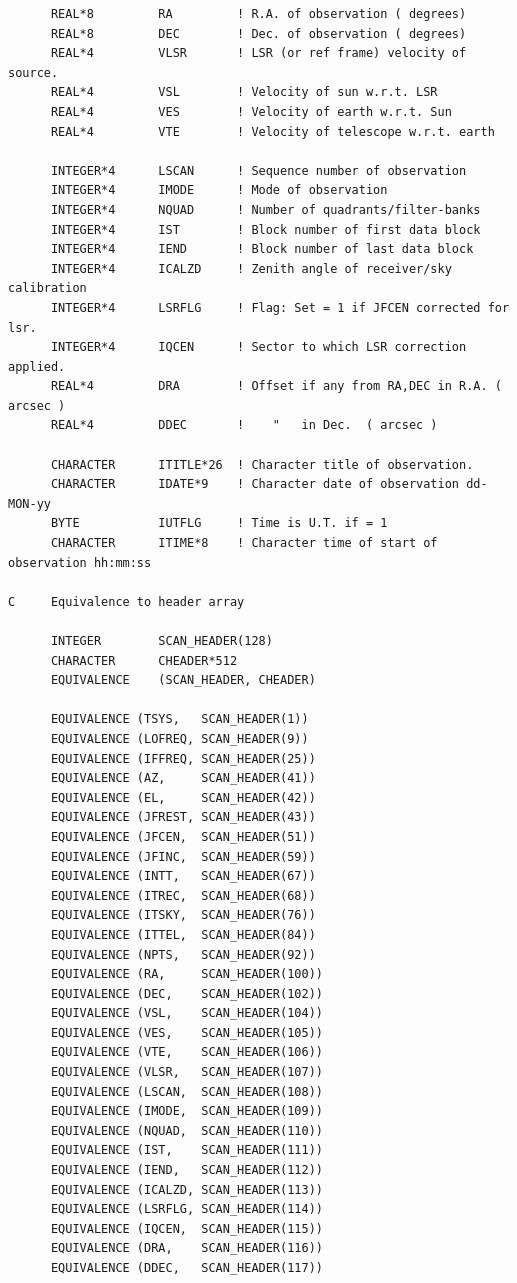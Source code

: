 \documentclass[11pt,twoside]{report}
\begin{document}
\begin{verbatim}
      REAL*8         RA         ! R.A. of observation ( degrees)
      REAL*8         DEC        ! Dec. of observation ( degrees)
      REAL*4         VLSR       ! LSR (or ref frame) velocity of source.
      REAL*4         VSL        ! Velocity of sun w.r.t. LSR
      REAL*4         VES        ! Velocity of earth w.r.t. Sun
      REAL*4         VTE        ! Velocity of telescope w.r.t. earth

      INTEGER*4      LSCAN      ! Sequence number of observation
      INTEGER*4      IMODE      ! Mode of observation
      INTEGER*4      NQUAD      ! Number of quadrants/filter-banks
      INTEGER*4      IST        ! Block number of first data block
      INTEGER*4      IEND       ! Block number of last data block
      INTEGER*4      ICALZD     ! Zenith angle of receiver/sky calibration
      INTEGER*4      LSRFLG     ! Flag: Set = 1 if JFCEN corrected for lsr.
      INTEGER*4      IQCEN      ! Sector to which LSR correction applied.
      REAL*4         DRA        ! Offset if any from RA,DEC in R.A. ( arcsec )
      REAL*4         DDEC       !    "   in Dec.  ( arcsec )      

      CHARACTER      ITITLE*26  ! Character title of observation.
      CHARACTER      IDATE*9    ! Character date of observation dd-MON-yy
      BYTE           IUTFLG     ! Time is U.T. if = 1
      CHARACTER      ITIME*8    ! Character time of start of observation hh:mm:ss

C     Equivalence to header array

      INTEGER        SCAN_HEADER(128)
      CHARACTER      CHEADER*512
      EQUIVALENCE    (SCAN_HEADER, CHEADER)

      EQUIVALENCE (TSYS,   SCAN_HEADER(1))
      EQUIVALENCE (LOFREQ, SCAN_HEADER(9))
      EQUIVALENCE (IFFREQ, SCAN_HEADER(25))
      EQUIVALENCE (AZ,     SCAN_HEADER(41))
      EQUIVALENCE (EL,     SCAN_HEADER(42))
      EQUIVALENCE (JFREST, SCAN_HEADER(43))
      EQUIVALENCE (JFCEN,  SCAN_HEADER(51))
      EQUIVALENCE (JFINC,  SCAN_HEADER(59))
      EQUIVALENCE (INTT,   SCAN_HEADER(67))
      EQUIVALENCE (ITREC,  SCAN_HEADER(68))
      EQUIVALENCE (ITSKY,  SCAN_HEADER(76))
      EQUIVALENCE (ITTEL,  SCAN_HEADER(84))
      EQUIVALENCE (NPTS,   SCAN_HEADER(92))
      EQUIVALENCE (RA,     SCAN_HEADER(100))
      EQUIVALENCE (DEC,    SCAN_HEADER(102))
      EQUIVALENCE (VSL,    SCAN_HEADER(104))
      EQUIVALENCE (VES,    SCAN_HEADER(105))
      EQUIVALENCE (VTE,    SCAN_HEADER(106))
      EQUIVALENCE (VLSR,   SCAN_HEADER(107))
      EQUIVALENCE (LSCAN,  SCAN_HEADER(108))
      EQUIVALENCE (IMODE,  SCAN_HEADER(109))
      EQUIVALENCE (NQUAD,  SCAN_HEADER(110))
      EQUIVALENCE (IST,    SCAN_HEADER(111))
      EQUIVALENCE (IEND,   SCAN_HEADER(112))
      EQUIVALENCE (ICALZD, SCAN_HEADER(113))
      EQUIVALENCE (LSRFLG, SCAN_HEADER(114))
      EQUIVALENCE (IQCEN,  SCAN_HEADER(115))
      EQUIVALENCE (DRA,    SCAN_HEADER(116))
      EQUIVALENCE (DDEC,   SCAN_HEADER(117))


\end{verbatim}
\end{document}
